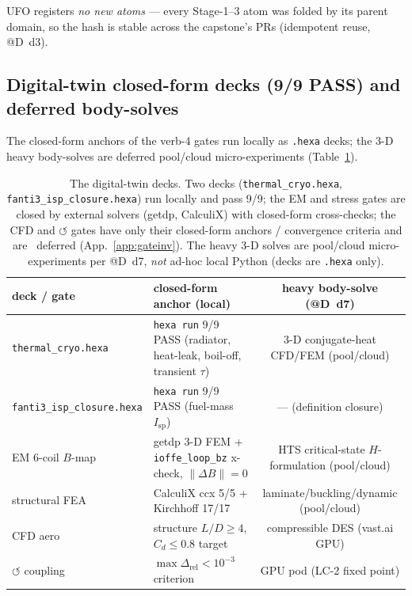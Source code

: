 UFO registers \emph{no new atoms} --- every Stage-1--3 atom was folded by
its parent domain, so the hash is stable across the capstone's PRs
(idempotent reuse, @D~d3).

\subsection{Digital-twin closed-form decks (9/9 PASS) and deferred body-solves}
\label{app:repro-decks}

The closed-form anchors of the verb-4 gates run locally as \verb|.hexa|
decks; the 3-D heavy body-solves are deferred pool/cloud
micro-experiments (Table~\ref{tab:repro-decks}).

\begin{table}[h]
\centering
\footnotesize
\setlength{\tabcolsep}{4pt}
\begin{tabular}{@{}>{\raggedright\arraybackslash}m{3.4cm} >{\raggedright\arraybackslash}m{4.2cm} c@{}}
\toprule
\textbf{deck / gate} & \textbf{closed-form anchor (local)} & \textbf{heavy body-solve (@D~d7)} \\
\midrule
\texttt{thermal\_cryo.hexa} & \texttt{hexa run} 9/9 PASS (radiator, heat-leak, boil-off, transient $\tau$) & 3-D conjugate-heat CFD/FEM (pool/cloud) \\
\texttt{fanti3\_isp\_closure.hexa} & \texttt{hexa run} 9/9 PASS (fuel-mass $I_{\text{sp}}$) & --- (definition closure) \\
EM 6-coil $B$-map & getdp 3-D FEM + \texttt{ioffe\_loop\_bz} x-check, $\|\Delta B\|=0$ & HTS critical-state $H$-formulation (pool/cloud) \\
structural FEA & CalculiX ccx 5/5 + Kirchhoff 17/17 & laminate/buckling/dynamic (pool/cloud) \\
CFD aero & structure $L/D{\ge}4$, $C_d{\le}0.8$ target & compressible DES (vast.ai GPU) \\
$\circlearrowleft$ coupling & $\max\Delta_{\text{rel}}{<}10^{-3}$ criterion & GPU pod (LC-2 fixed point) \\
\bottomrule
\end{tabular}
\caption{The digital-twin decks. Two decks
(\texttt{thermal\_cryo.hexa}, \texttt{fanti3\_isp\_closure.hexa}) run
locally and pass 9/9; the EM and stress gates are closed by external
solvers (getdp, CalculiX) with closed-form cross-checks; the CFD and
$\circlearrowleft$ gates have only their closed-form anchors / convergence
criteria and are \tierOrange\ deferred (App.~\ref{app:gateinv}). The
heavy 3-D solves are pool/cloud micro-experiments per @D~d7, \emph{not}
ad-hoc local Python (decks are \texttt{.hexa} only).}
\label{tab:repro-decks}
\end{table}

